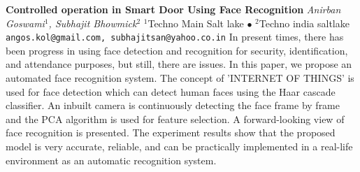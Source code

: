 
    \begin{conf-abstract}[]
        {\textbf{Controlled operation in Smart Door Using Face Recognition}}
        {\textit{Anirban Goswami$^{1}$, Subhajit Bhowmick$^{2}$}}
        {$^{1}$Techno Main Salt lake $\bullet$ $^{2}$Techno india saltlake}
        {\texttt{angos.kol@gmail.com, subhajitsan@yahoo.co.in}}
        {In present times, there has been progress in using face detection and recognition for security, identification, and attendance purposes, but still, there are issues. In this paper, we propose an automated face recognition system. The concept of 'INTERNET OF THINGS' is used for face detection which can detect human faces using the Haar cascade classifier. An inbuilt camera is continuously detecting the face frame by frame and the PCA algorithm is used for feature selection. A forward-looking view of face recognition is presented. The experiment results show that the proposed model is very accurate, reliable, and can be practically implemented in a real-life environment as an automatic recognition system.}
    \end{conf-abstract}
        